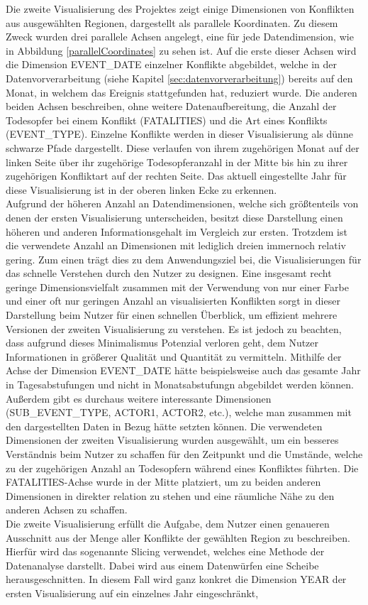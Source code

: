 \documentclass[usegeometry=true]{scrartcl}
\begin{document}
Die zweite Visualisierung des Projektes zeigt einige Dimensionen von Konflikten aus ausgewählten Regionen, dargestellt als parallele Koordinaten. Zu diesem Zweck wurden drei parallele Achsen angelegt, eine für jede Datendimension, wie in Abbildung \ref{parallelCoordinates} zu sehen ist. Auf die erste dieser Achsen wird die Dimension EVENT\_DATE einzelner Konflikte abgebildet, welche in der Datenvorverarbeitung (siehe Kapitel \ref{sec:datenvorverarbeitung}) bereits auf den Monat, in welchem das Ereignis stattgefunden hat, reduziert wurde. Die anderen beiden Achsen beschreiben, ohne weitere Datenaufbereitung, die Anzahl der Todesopfer bei einem Konflikt (FATALITIES) und die Art eines Konflikts (EVENT\_TYPE). Einzelne Konflikte werden in dieser Visualisierung als dünne schwarze Pfade dargestellt. Diese verlaufen von ihrem zugehörigen Monat auf der linken Seite über ihr zugehörige Todesopferanzahl in der Mitte bis hin zu ihrer zugehörigen Konfliktart auf der rechten Seite. Das aktuell eingestellte Jahr für diese Visualisierung ist in der oberen linken Ecke zu erkennen.\\ Aufgrund der höheren Anzahl an Datendimensionen, welche sich größtenteils von denen der ersten Visualisierung unterscheiden, besitzt diese Darstellung einen höheren und anderen Informationsgehalt im Vergleich zur ersten. Trotzdem ist die verwendete Anzahl an Dimensionen mit lediglich dreien immernoch relativ gering. Zum einen trägt dies zu dem Anwendungsziel bei, die Visualisierungen für das schnelle Verstehen durch den Nutzer zu designen. Eine insgesamt recht geringe Dimensionsvielfalt zusammen mit der Verwendung von nur einer Farbe und einer oft nur geringen Anzahl an visualisierten Konflikten sorgt in dieser Darstellung beim Nutzer für einen schnellen Überblick, um effizient mehrere Versionen der zweiten Visualisierung zu verstehen. Es ist jedoch zu beachten, dass aufgrund dieses Minimalismus Potenzial verloren geht, dem Nutzer Informationen in größerer Qualität und Quantität zu vermitteln. Mithilfe der Achse der Dimension EVENT\_DATE hätte beispielsweise auch das gesamte Jahr in Tagesabstufungen und nicht in Monatsabstufungn abgebildet werden können. Außerdem gibt es durchaus weitere interessante Dimensionen (SUB\_EVENT\_TYPE, ACTOR1, ACTOR2, etc.), welche man zusammen mit den dargestellten Daten in Bezug hätte setzten können. Die verwendeten Dimensionen der zweiten Visualisierung wurden ausgewählt, um ein besseres Verständnis beim Nutzer zu schaffen für den Zeitpunkt und die Umstände, welche zu der zugehörigen Anzahl an Todesopfern während eines Konfliktes führten. Die FATALITIES-Achse wurde in der Mitte platziert, um zu beiden anderen Dimensionen in direkter relation zu stehen und eine räumliche Nähe zu den anderen Achsen zu schaffen.\\ Die zweite Visualisierung erfüllt die Aufgabe, dem Nutzer einen genaueren Ausschnitt aus der Menge aller Konflikte der gewählten Region zu beschreiben. Hierfür wird das sogenannte \glqq Slicing\grqq{} verwendet, welches eine Methode der Datenanalyse darstellt. Dabei wird aus einem Datenwürfen eine Scheibe \glqq herausgeschnitten\grqq. In diesem Fall wird ganz konkret die Dimension YEAR der ersten Visualisierung auf ein einzelnes Jahr eingeschränkt, 
\end{document}

